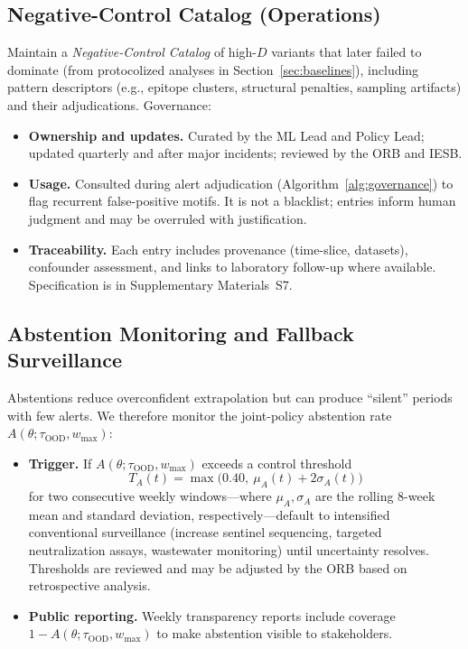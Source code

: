 \documentclass[11pt]{article}
\begin{document}
\subsection{Negative-Control Catalog (Operations)}
\label{sec:nc-catalog}
Maintain a \emph{Negative-Control Catalog} of high-$D$ variants that later failed to dominate (from protocolized analyses in Section~\ref{sec:baselines}), including pattern descriptors (e.g., epitope clusters, structural penalties, sampling artifacts) and their adjudications. Governance:
\begin{itemize}[leftmargin=*, itemsep=2pt, topsep=2pt]
\item \textbf{Ownership and updates.} Curated by the ML Lead and Policy Lead; updated quarterly and after major incidents; reviewed by the ORB and IESB.
\item \textbf{Usage.} Consulted during alert adjudication (Algorithm~\ref{alg:governance}) to flag recurrent false-positive motifs. It is not a blacklist; entries inform human judgment and may be overruled with justification.
\item \textbf{Traceability.} Each entry includes provenance (time-slice, datasets), confounder assessment, and links to laboratory follow-up where available. Specification is in Supplementary Materials~S7.
\end{itemize}

\subsection{Abstention Monitoring and Fallback Surveillance}
\label{sec:abstention-monitoring}
Abstentions reduce overconfident extrapolation but can produce “silent” periods with few alerts. We therefore monitor the joint-policy abstention rate $A(\theta;\tau_{\text{OOD}},w_{\max})$:
\begin{itemize}[leftmargin=*, itemsep=2pt, topsep=2pt]
\item \textbf{Trigger.} If $A(\theta;\tau_{\text{OOD}},w_{\max})$ exceeds a control threshold 
\[
T_A(t)=\max\!\big(0.40,\ \mu_A(t)+2\sigma_A(t)\big)
\]
for two consecutive weekly windows—where $\mu_A,\sigma_A$ are the rolling 8-week mean and standard deviation, respectively—default to intensified conventional surveillance (increase sentinel sequencing, targeted neutralization assays, wastewater monitoring) until uncertainty resolves. Thresholds are reviewed and may be adjusted by the ORB based on retrospective analysis.
\item \textbf{Public reporting.} Weekly transparency reports include coverage $1-A(\theta;\tau_{\text{OOD}},w_{\max})$ to make abstention visible to stakeholders.
\end{itemize}
\end{document}
